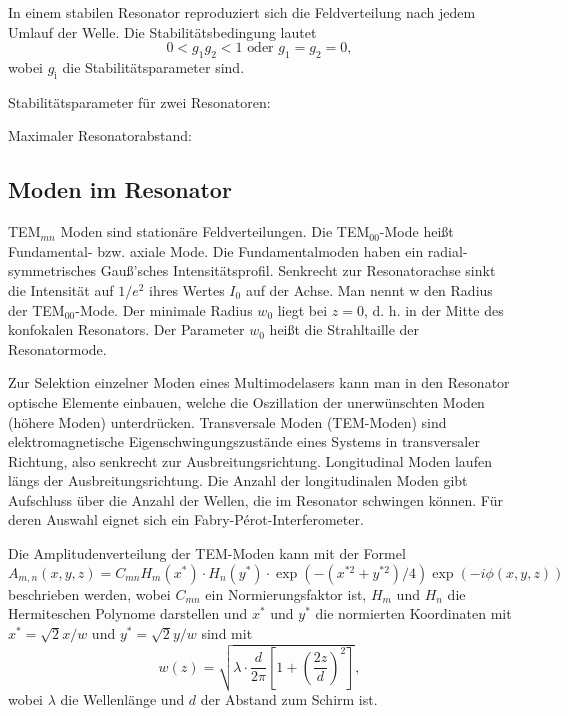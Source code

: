In einem stabilen Resonator reproduziert sich die Feldverteilung nach jedem Umlauf der Welle.
Die Stabilitätsbedingung lautet
\begin{equation}
    0 < g_1 g_2 < 1 \text{ oder } g_1 = g_2 = 0,
    \label{eq:stabilität}
\end{equation}
wobei $g_\text{i}$ die Stabilitätsparameter sind.

Stabilitätsparameter für zwei Resonatoren:

Maximaler Resonatorabstand:


\subsection{Moden im Resonator}
%
TEM$_{mn}$ Moden sind stationäre Feldverteilungen.
Die TEM$_{00}$-Mode heißt Fundamental- bzw. axiale Mode.
Die Fundamentalmoden haben ein radial-symmetrisches Gauß’sches Intensitätsprofil. Senkrecht zur Resonatorachse sinkt die Intensität auf $1/e^2$ ihres Wertes $I_0$ auf der Achse. Man nennt w den Radius der TEM$_{00}$-Mode. Der minimale Radius $w_0$ liegt bei $z=0$, d. h. in der Mitte des konfokalen Resonators.
Der Parameter $w_0$ heißt die Strahltaille der Resonatormode.

Zur Selektion einzelner Moden eines Multimodelasers kann man in den Resonator optische Elemente einbauen, welche die Oszillation der unerwünschten Moden (höhere Moden) unterdrücken.
Transversale Moden (TEM-Moden) sind elektromagnetische Eigenschwingungszustände eines Systems in transversaler Richtung, also senkrecht zur Ausbreitungsrichtung.
Longitudinal Moden laufen längs der Ausbreitungsrichtung. 
Die Anzahl der longitudinalen Moden gibt Aufschluss über die Anzahl der Wellen, die im Resonator schwingen können.
Für deren Auswahl eignet sich ein Fabry-Pérot-Interferometer.

Die Amplitudenverteilung der TEM-Moden kann mit der Formel 
\begin{equation}
    A_{m,n}\left(x,y,z\right) = C_{mn} H_m\left(x^*\right)\cdot H_n\left(y^*\right) \cdot \exp\left(-\left( x^{*2} + y^{*2} \right)/4 \right) \exp\left( -i \phi \left( x,y,z \right)\right) 
    \label{eq:amp}
\end{equation}
beschrieben werden, wobei $C_{mn}$ ein Normierungsfaktor ist, $H_m$ und $H_n$ die Hermiteschen Polynome darstellen und $x^*$ und $y^*$ die normierten Koordinaten mit $x^*= \sqrt{2} x/w$ und  $y^*= \sqrt{2} y/w$ sind mit 
\begin{equation*}
    w(z) = \sqrt{\lambda \cdot \frac{d}{2\pi}\left[ 1 + \left(\frac{2z}{d} \right)^2 \right]},
\end{equation*}
wobei $\lambda$ die Wellenlänge und $d$ der Abstand zum Schirm ist. %

